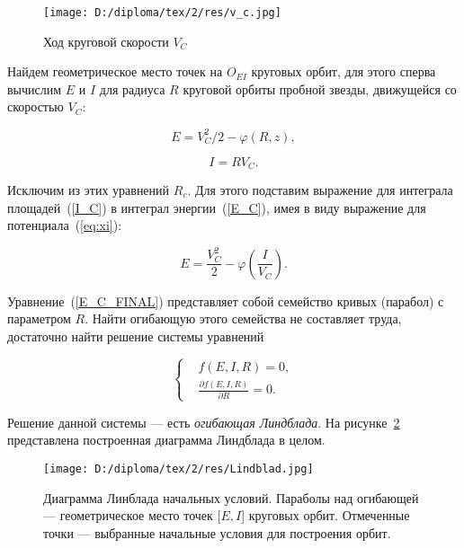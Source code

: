 \begin{figure}[H]
\centering
\begin{minipage}[t]{0.7\textwidth}
\centering
\texttt{[image: D:/diploma/tex/2/res/v\_c.jpg]}
\end{minipage}
\caption{Ход круговой скорости $V_C$}\label{V_C}
\end{figure}

Найдем геометрическое место точек на $O_{EI}$ круговых орбит, для этого сперва вычислим $E$ и $I$ для радиуса $R$ круговой орбиты пробной звезды, движущейся со скоростью $V_C$:

\begin{equation}\label{E_C}
E = V_C^2/2 - \varphi(R, z),
\end{equation}

\begin{equation}\label{I_C}
I = RV_C.
\end{equation}

Исключим из этих уравнений $R_c$. Для этого подставим выражение для интеграла площадей~(\ref{I_C}) в интеграл энергии~(\ref{E_C}), имея в виду выражение для потенциала~(\ref{eq:xi}):

\begin{equation}\label{E_C_FINAL}
E = \frac{V_C^2}{2} - \varphi \left( \frac{I}{V_C} \right).
\end{equation}

Уравнение~(\ref{E_C_FINAL}) представляет собой семейство кривых (парабол) с параметром $R$. Найти огибающую этого семейства не составляет труда, достаточно найти решение системы уравнений

\begin{equation}
\left\{ \begin{aligned}
&f(E, I, R) = 0, \\
&\frac{\partial f(E, I, R)}{\partial R} = 0.
\end{aligned}
\right.
\end{equation}

Решение данной системы --- есть \emph{огибающая Линдблада}. На рисунке~\ref{LINDBLAD} представлена построенная диаграмма Линдблада в целом.

\begin{figure}[H]
\centering
\begin{minipage}[t]{1\textwidth}
\centering
\texttt{[image: D:/diploma/tex/2/res/Lindblad.jpg]}
\end{minipage}
\caption{Диаграмма Линблада начальных условий. Параболы над огибающей --- геометрическое место точек [$E,I$] круговых орбит. Отмеченные точки --- выбранные начальные условия для построения орбит.}\label{LINDBLAD}
\end{figure}


